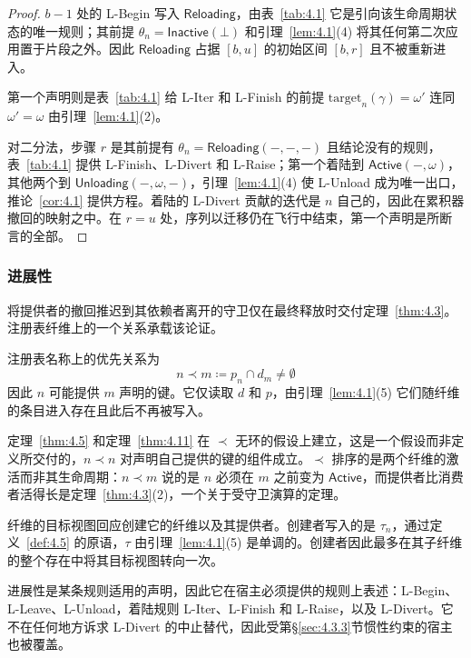 \begin{proof}
$b - 1$ 处的 L-Begin 写入 $\mathsf{Reloading}$，由表~\ref{tab:4.1} 它是引向该生命周期状态的唯一规则；其前提 $\theta_n = \mathsf{Inactive}(\bot)$ 和引理~\ref{lem:4.1}(4) 将其任何第二次应用置于片段之外。因此 $\mathsf{Reloading}$ 占据 $[b, u]$ 的初始区间 $[b, r]$ 且不被重新进入。

第一个声明则是表~\ref{tab:4.1} 给 L-Iter 和 L-Finish 的前提 $\mathrm{target}_n(\gamma) = \omega'$ 连同 $\omega' = \omega$ 由引理~\ref{lem:4.1}(2)。

对二分法，步骤 $r$ 是其前提有 $\theta_n = \mathsf{Reloading}(-, -, -)$ 且结论没有的规则，表~\ref{tab:4.1} 提供 L-Finish、L-Divert 和 L-Raise；第一个着陆到 $\mathsf{Active}(-, \omega)$，其他两个到 $\mathsf{Unloading}(-, \omega, -)$，引理~\ref{lem:4.1}(4) 使 L-Unload 成为唯一出口，推论~\ref{cor:4.1} 提供方程。着陆的 L-Divert 贡献的迭代是 $n$ 自己的，因此在累积器撤回的映射之中。在 $r = u$ 处，序列以迁移仍在飞行中结束，第一个声明是所断言的全部。
\end{proof}

\subsubsection{进展性}\label{sec:4.4.4}

将提供者的撤回推迟到其依赖者离开的守卫仅在最终释放时交付定理~\ref{thm:4.3}。注册表纤维上的一个关系承载该论证。

\begin{definition}\label{def:4.14}
注册表名称上的优先关系为
\begin{equation}\label{eq:4.29}
n \prec m \coloneqq p_n \cap d_m \neq \emptyset
\end{equation}
因此 $n$ 可能提供 $m$ 声明的键。它仅读取 $d$ 和 $p$，由引理~\ref{lem:4.1}(5) 它们随纤维的条目进入存在且此后不再被写入。
\end{definition}

定理~\ref{thm:4.5} 和定理~\ref{thm:4.11} 在 $\prec$ 无环的假设上建立，这是一个假设而非定义所交付的，$n \prec n$ 对声明自己提供的键的组件成立。$\prec$ 排序的是两个纤维的激活而非其生命周期：$n \prec m$ 说的是 $n$ 必须在 $m$ 之前变为 $\mathsf{Active}$，而提供者比消费者活得长是定理~\ref{thm:4.3}(2)，一个关于受守卫演算的定理。

纤维的目标视图回应创建它的纤维以及其提供者。创建者写入的是 $\tau_n$，通过定义~\ref{def:4.5} 的原语，$\tau$ 由引理~\ref{lem:4.1}(5) 是单调的。创建者因此最多在其子纤维的整个存在中将其目标视图转向一次。

进展性是某条规则适用的声明，因此它在宿主必须提供的规则上表述：L-Begin、L-Leave、L-Unload，着陆规则 L-Iter、L-Finish 和 L-Raise，以及 L-Divert。它不在任何地方诉求 L-Divert 的中止替代，因此受第\S\ref{sec:4.3.3}节惯性约束的宿主也被覆盖。

